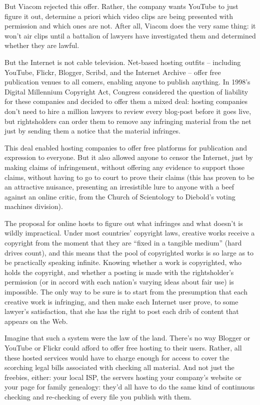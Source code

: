 But Viacom rejected this offer. Rather, the company wants YouTube
to just figure it out, determine a priori which video clips are
being presented with permission and which ones are not. After all,
Viacom does the very same thing: it won't air clips until a
battalion of lawyers have investigated them and determined whether
they are lawful.

But the Internet is not cable television. Net-based hosting outfits
-- including YouTube, Flickr, Blogger, Scribd, and the Internet
Archive -- offer free publication venues to all comers, enabling
anyone to publish anything. In 1998's Digital Millennium Copyright
Act, Congress considered the question of liability for these
companies and decided to offer them a mixed deal: hosting companies
don't need to hire a million lawyers to review every blog-post
before it goes live, but rightsholders can order them to remove any
infringing material from the net just by sending them a notice that
the material infringes.

This deal enabled hosting companies to offer free platforms for
publication and expression to everyone. But it also allowed anyone
to censor the Internet, just by making claims of infringement,
without offering any evidence to support those claims, without
having to go to court to prove their claims (this has proven to be
an attractive nuisance, presenting an irresistible lure to anyone
with a beef against an online critic, from the Church of
Scientology to Diebold's voting machines division).

The proposal for online hosts to figure out what infringes and what
doesn't is wildly impractical. Under most countries' copyright
laws, creative works receive a copyright from the moment that they
are ``fixed in a tangible medium'' (hard drives count), and this
means that the pool of copyrighted works is so large as to be
practically speaking infinite. Knowing whether a work is
copyrighted, who holds the copyright, and whether a posting is made
with the rightsholder's permission (or in accord with each nation's
varying ideas about fair use) is impossible. The only way to be
sure is to start from the presumption that each creative work is
infringing, and then make each Internet user prove, to some
lawyer's satisfaction, that she has the right to post each drib of
content that appears on the Web.

Imagine that such a system were the law of the land. There's no way
Blogger or YouTube or Flickr could afford to offer free hosting to
their users. Rather, all these hosted services would have to charge
enough for access to cover the scorching legal bills associated
with checking all material. And not just the freebies, either: your
local ISP, the servers hosting your company's website or your page
for family genealogy: they'd all have to do the same kind of
continuous checking and re-checking of every file you publish with
them.

